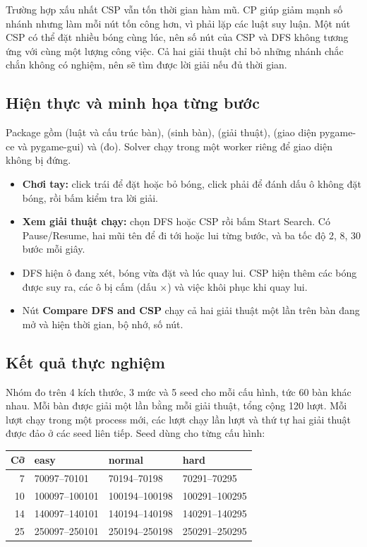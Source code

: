 Trường hợp xấu nhất CSP vẫn tốn thời gian hàm mũ. CP giúp giảm mạnh số nhánh
nhưng làm mỗi nút tốn công hơn, vì phải lặp các luật suy luận. Một nút CSP có
thể đặt nhiều bóng cùng lúc, nên số nút của CSP và DFS không tương ứng với cùng
một lượng công việc. Cả hai giải thuật chỉ bỏ những nhánh chắc chắn không có
nghiệm, nên sẽ tìm được lời giải nếu đủ thời gian.

\subsection{Hiện thực và minh họa từng bước}
Package  gồm  (luật và cấu trúc bàn),
 (sinh bàn),  (giải thuật),
 (giao diện pygame-ce và pygame-gui) và  (đo).
Solver chạy trong một worker riêng để giao diện không bị đứng.

\begin{itemize}
\item \textbf{Chơi tay:} click trái để đặt hoặc bỏ bóng, click phải để đánh dấu
ô không đặt bóng, rồi bấm kiểm tra lời giải.
\item \textbf{Xem giải thuật chạy:} chọn DFS hoặc CSP rồi bấm Start Search.
Có Pause/Resume, hai mũi tên để đi tới hoặc lui từng bước, và ba tốc độ
2, 8, 30 bước mỗi giây.
\item DFS hiện ô đang xét, bóng vừa đặt và lúc quay lui. CSP hiện thêm các bóng
được suy ra, các ô bị cấm (dấu $\times$) và việc khôi phục khi quay lui.
\item Nút \textbf{Compare DFS and CSP} chạy cả hai giải thuật một lần trên bàn
đang mở và hiện thời gian, bộ nhớ, số nút.
\end{itemize}

\subsection{Kết quả thực nghiệm}
Nhóm đo trên 4 kích thước, 3 mức và 5 seed cho mỗi cấu hình, tức 60 bàn khác
nhau. Mỗi bàn được giải một lần bằng mỗi giải thuật, tổng cộng 120 lượt. Mỗi
lượt chạy trong một process mới, các lượt chạy lần lượt và thứ tự hai giải thuật
được đảo ở các seed liên tiếp. Seed dùng cho từng cấu hình:
\begin{center}\small
\begin{tabular}{@{}rlll@{}}\toprule
Cỡ & easy & normal & hard\\\midrule
7 & 70097--70101 & 70194--70198 & 70291--70295\\
10 & 100097--100101 & 100194--100198 & 100291--100295\\
14 & 140097--140101 & 140194--140198 & 140291--140295\\
25 & 250097--250101 & 250194--250198 & 250291--250295\\
\bottomrule\end{tabular}
\end{center}

